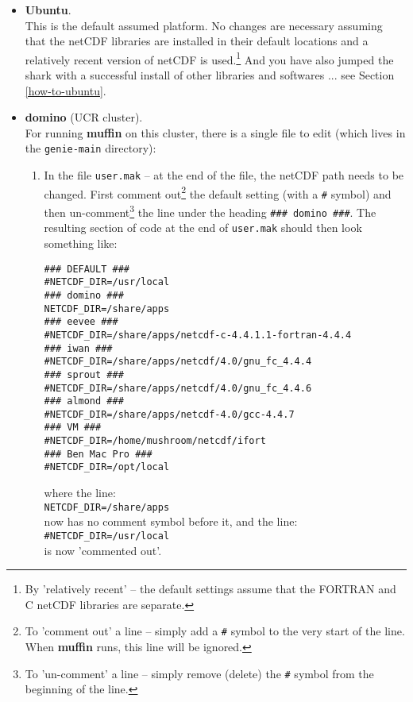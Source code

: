 \documentclass[11pt,fleqn]{book} %
\begin{document}
\begin{itemize}

\vspace{1mm}
\item \textbf{Ubuntu}. 
\vspace{1mm}
\\ This is the default assumed platform. No changes are necessary assuming that the netCDF libraries are installed in their default locations and a relatively recent version of netCDF is used.\footnote{By 'relatively recent' -- the default settings assume that the FORTRAN and C netCDF libraries are separate.} And you have also jumped the shark with a successful install of other libraries and softwares ... see Section \ref{how-to-ubuntu}.

\vspace{1mm}
\item \textbf{domino} (UCR cluster).
\vspace{1mm} 
\\ For running \textbf{muffin} on this cluster, there is a single file to edit (which lives in the \texttt{genie-main} directory):
\vspace{1mm}
\begin{enumerate}[noitemsep]
\item In the file \texttt{user.mak} -- at the end of the file, the netCDF path needs to be changed. First comment out\footnote{To 'comment out' a line -- simply add a \texttt{\#} symbol to the very start of the line. When \textbf{muffin} runs, this line will be ignored.} the default setting (with a \texttt{\#} symbol) and then un-comment\footnote{To 'un-comment' a line -- simply remove (delete) the \texttt{\#} symbol from the beginning of the line.} the line under the heading \texttt{\#\#\# domino \#\#\#}. The resulting section of code at the end of \texttt{user.mak}  should then look something like:
\vspace{-1mm}
\footnotesize\begin{verbatim}
### DEFAULT ###
#NETCDF_DIR=/usr/local
### domino ###
NETCDF_DIR=/share/apps
### eevee ###
#NETCDF_DIR=/share/apps/netcdf-c-4.4.1.1-fortran-4.4.4
### iwan ###
#NETCDF_DIR=/share/apps/netcdf/4.0/gnu_fc_4.4.4
### sprout ###
#NETCDF_DIR=/share/apps/netcdf/4.0/gnu_fc_4.4.6
### almond ###
#NETCDF_DIR=/share/apps/netcdf-4.0/gcc-4.4.7
### VM ###
#NETCDF_DIR=/home/mushroom/netcdf/ifort
### Ben Mac Pro ###
#NETCDF_DIR=/opt/local
\end{verbatim}\normalsize
\vspace{-1mm}
where the line:
\\\texttt{\small NETCDF\_DIR=/share/apps}
\\now has no comment symbol before it, and the line:
\\\texttt{\small \#NETCDF\_DIR=/usr/local}
\\is now 'commented out'.
\end{enumerate}


\end{itemize}
\end{document}
